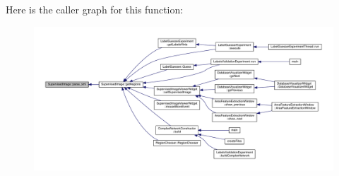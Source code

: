 Here is the caller graph for this function\+:
\nopagebreak
\begin{figure}[H]
\begin{center}
\leavevmode
\includegraphics[width=350pt]{class_supervised_image_ae351771d19a2bbd53c88e871ed5bb4de_icgraph}
\end{center}
\end{figure}





